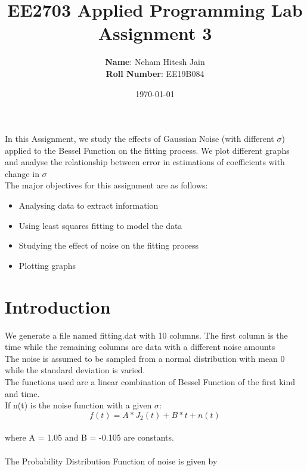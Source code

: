 \documentclass[11pt, a4paper]{article}
\title{EE2703 Applied Programming Lab \\ Assignment 3}
\author{
  \textbf{Name}: Neham Hitesh Jain\\
  \textbf{Roll Number}: EE19B084
}\date{\today}
\begin{document}
		
		
\maketitle %

\par In this Assignment, we study the effects of Gaussian Noise (with different $\sigma$) applied to the Bessel Function on the fitting process. We plot different graphs and analyse the relationship between error in estimations of coefficients with change in $\sigma$ \\
 The major objectives for this assignment are as follows:

\begin{itemize}
\item Analysing data to extract information
\item Using least squares fitting to model the data 
\item Studying the effect of noise on the fitting process
\item Plotting graphs
\end{itemize}

\section{Introduction}

We generate a file named fitting.dat with 10 columns. The first column is the time while the remaining columns are data with a different noise amounts\\
The noise is assumed to be sampled from a normal distribution with mean 0 while the standard deviation is varied. \\

\noindent
The functions used are a linear combination of Bessel Function of the first kind and time.\\

\noindent
If n(t) is the noise function with a given $\sigma$:\\
\begin{equation*}
f(t) = A*J_{2}(t) + B*t + n(t)
\end{equation*}
\\
where A = 1.05 and B = -0.105 are constants.\\~\\


\noindent
The Probability Distribution Function of noise is given by
\end{document}
